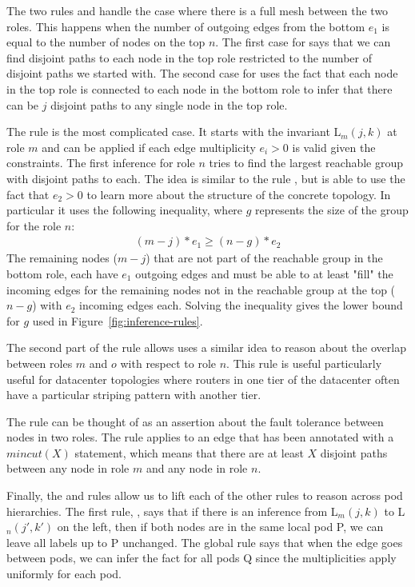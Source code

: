 \documentclass[numbers, 10pt, preprint]{sigplanconf}
\begin{document}
The two rules  and  handle the case where there is a full mesh between the two roles. This happens when the number of outgoing edges from the bottom $e_1$ is equal to the number of nodes on the top $n$. The first case for  says that we can find disjoint paths to each node in the top role restricted to the number of disjoint paths we started with. The second case for  uses the fact that each node in the top role is connected to each node in the bottom role to infer that there can be $j$ disjoint paths to any single node in the top role.

The rule  is the most complicated case.
It starts with the invariant L$_m(j,k)$ at role $m$ and can be applied if each edge multiplicity $e_i > 0$ is valid given the constraints. The first inference for role $n$ tries to find the largest reachable group with disjoint paths to each. The idea is similar to the rule , but is able to use the fact that $e_2 > 0$ to learn more about the structure of the concrete topology. In particular it uses the following inequality, where $g$ represents the size of the group for the role $n$:
%
\[ \begin{array}{c}
  (m-j)*e_1 \geq (n-g)*e_2
\end{array} \]
\noindent
%
The remaining nodes ($m-j$) that are not part of the reachable group in the bottom role, each have $e_1$ outgoing edges and must be able to at least "fill" the incoming edges for the remaining nodes not in the reachable group at the top ($n-g$) with $e_2$ incoming edges each. Solving the inequality gives the lower bound for $g$ used in Figure~\ref{fig:inference-rules}.

The second part of the rule allows uses a similar idea to reason about the overlap between roles $m$ and $o$ with respect to role $n$. This rule is useful particularly useful for datacenter topologies where routers in one tier of the datacenter often have a particular striping pattern with another tier.

The rule  can be thought of as an assertion about the fault tolerance between nodes in two roles. The rule applies to an edge that has been annotated with a $mincut(X)$ statement, which means that there are at least $X$ disjoint paths between any node in role $m$ and any node in role $n$.

Finally, the  and  rules allow us to lift each of the other rules to reason across pod hierarchies. The first rule, , says that if there is an inference from L$_m(j,k)$ to L$_n(j',k')$ on the left, then if both nodes are in the same local pod P, we can leave all labels up to P unchanged. The global rule  says that when the edge goes between pods, we can infer the fact for all pods Q since the multiplicities apply uniformly for each pod.
\end{document}
